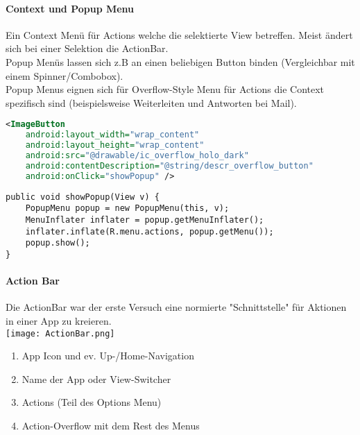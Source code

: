 \paragraph{Context und Popup Menu} Ein Context Menü für Actions welche die selektierte View betreffen. Meist ändert sich bei einer Selektion die ActionBar.\\
Popup Menüs lassen sich z.B an einen beliebigen Button binden (Vergleichbar mit einem Spinner/Combobox). \\
Popup Menus eignen sich für Overflow-Style Menu für Actions die Context spezifisch sind (beispielsweise Weiterleiten und Antworten bei Mail). 
\begin{lstlisting}[language=xml]
<ImageButton
    android:layout_width="wrap_content" 
    android:layout_height="wrap_content" 
    android:src="@drawable/ic_overflow_holo_dark"
    android:contentDescription="@string/descr_overflow_button"
    android:onClick="showPopup" />
\end{lstlisting}
\begin{lstlisting}
public void showPopup(View v) {
    PopupMenu popup = new PopupMenu(this, v);
    MenuInflater inflater = popup.getMenuInflater();
    inflater.inflate(R.menu.actions, popup.getMenu());
    popup.show();
}
\end{lstlisting}
\paragraph{Action Bar} Die ActionBar war der erste Versuch eine normierte "{}Schnittstelle"{} für Aktionen in einer App zu kreieren. \\
\texttt{[image: ActionBar.png]}
\begin{enumerate}
\item App Icon und ev. Up-/Home-Navigation
\item Name der App oder View-Switcher
\item Actions (Teil des Options Menu)
\item Action-Overflow mit dem Rest des Menus
\end{enumerate}
